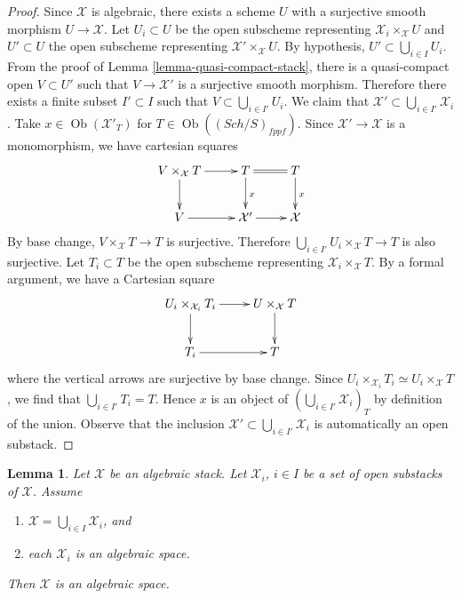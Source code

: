 \documentclass{stacks-project}
\theoremstyle{plain}
\newtheorem{lemma}[subsection]{Lemma}
\theoremstyle{definition}
\theoremstyle{remark}
\numberwithin{equation}{subsection}
\def\Sch{\mathit{Sch}}
\def\Ob{\mathop{\mathrm{Ob}}\nolimits}
\begin{document}
\begin{proof}
Since $\mathcal X$ is algebraic, there exists a scheme $U$ with a surjective
smooth morphism $U \to \mathcal X$. Let $U_i \subset U$ be the open subscheme
representing $\mathcal{X}_i \times_{\mathcal X} U$ and $U' \subset U$ the
open subscheme representing $\mathcal{X}' \times_{\mathcal X} U$. By
hypothesis, $U'\subset \bigcup_{i\in I} U_i$. From the proof of
Lemma \ref{lemma-quasi-compact-stack},
there is a quasi-compact open $V \subset U'$ such that $V \to \mathcal{X}'$
is a surjective smooth morphism. Therefore there exists a finite subset
$I' \subset I$ such that $V \subset \bigcup_{i \in I'}
U_i$. We claim that $\mathcal{X}' \subset \bigcup_{i \in I'} \mathcal{X}_i$.
Take $x \in \Ob(\mathcal{X}'_T)$ for
$T \in \Ob((\Sch/S)_{fppf})$.
Since $\mathcal{X}' \to \mathcal{X}$ is a monomorphism, we have cartesian
squares
$$
\xymatrix{
V \times_\mathcal{X} T \ar[r] \ar[d] &
T \ar[d]^x \ar@{=}[r] &
T \ar[d]^x \\
V \ar[r] &
\mathcal{X}' \ar[r] &
\mathcal X
}
$$
By base change, $V \times_{\mathcal X} T \to T$ is surjective. Therefore
$\bigcup_{i \in I'} U_i \times_{\mathcal X} T \to T$ is also surjective.
Let $T_i \subset T$ be the open subscheme representing
$\mathcal{X}_i \times_{\mathcal X} T$.
By a formal argument, we have a Cartesian square
$$
\xymatrix{
U_i \times_{\mathcal{X}_i} T_i \ar[r] \ar[d] &
U \times_{\mathcal X} T \ar[d] \\
T_i \ar[r] & T
}
$$
where the vertical arrows are surjective by base change. Since
$U_i \times_{\mathcal{X}_i} T_i \simeq U_i \times_{\mathcal X} T$,
we find that $\bigcup_{i \in I'} T_i = T$. Hence
$x$ is an object of $(\bigcup_{i\in I'} \mathcal{X}_i)_T$ by
definition of the union. Observe that the inclusion
$\mathcal{X}' \subset \bigcup_{i \in I'} \mathcal{X}_i$
is automatically an open substack.
\end{proof}

\begin{lemma}
\label{lemma-zariski-open-cover-stack-is-space}
Let $\mathcal X$ be an algebraic stack.
Let $\mathcal{X}_i$, $i \in I$ be a set of open substacks of $\mathcal{X}$.
Assume
\begin{enumerate}
\item $\mathcal{X} = \bigcup_{i \in I} \mathcal{X}_i$, and
\item each $\mathcal{X}_i$ is an algebraic space.
\end{enumerate}
Then $\mathcal{X}$ is an algebraic space.
\end{lemma}
\end{document}
